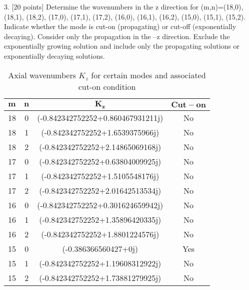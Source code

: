 \documentclass[]{aiaa-tc}%
\begin{document}
3. [20 points] Determine the wavenumbers in the z direction for (m,n)=(18,0), (18,1), (18,2), (17,0), (17,1), (17,2), (16,0), (16,1), (16,2), (15,0), (15,1), (15,2). Indicate whether the mode is cut-on (propagating) or cut-off (exponentially decaying). Consider only the propagation in the –z direction. Exclude the exponentially growing solution and include only the propagating solutions or exponentially decaying solutions.

\begin{table}[htb]
\begin{centering}
\begin{tabular}{| c c c c |}
\hline
$\mathbf{m}$ &  $\mathbf{n}$ &                      $\mathbf{K_z}$ & $\mathbf{Cut-on}$ \\
\hline
18 &             0 &  (-0.842342752252+0.860467931211j) &                No \\
18 &             1 &    (-0.842342752252+1.6539375966j) &                No \\
18 &             2 &   (-0.842342752252+2.14865069168j) &                No \\
\hline
17 &             0 &  (-0.842342752252+0.63804009925j) &                No \\
17 &             1 &   (-0.842342752252+1.5105548176j) &                No \\
17 &             2 &  (-0.842342752252+2.01642513534j) &                No \\
\hline
16 &             0 &  (-0.842342752252+0.301624659942j) &                No \\
16 &             1 &   (-0.842342752252+1.35896420335j) &                No \\
16 &             2 &    (-0.842342752252+1.8801224576j) &                No \\
\hline
15 &             0 &              (-0.386366560427+0j) &               Yes \\
15 &             1 &  (-0.842342752252+1.19608312922j) &                No \\
15 &             2 &  (-0.842342752252+1.73881279925j) &                No \\
\hline
\end{tabular}
\caption{Axial wavenumbers $K_z$ for certain modes and associated cut-on condition}
\end{centering}
\end{table}
\end{document}
